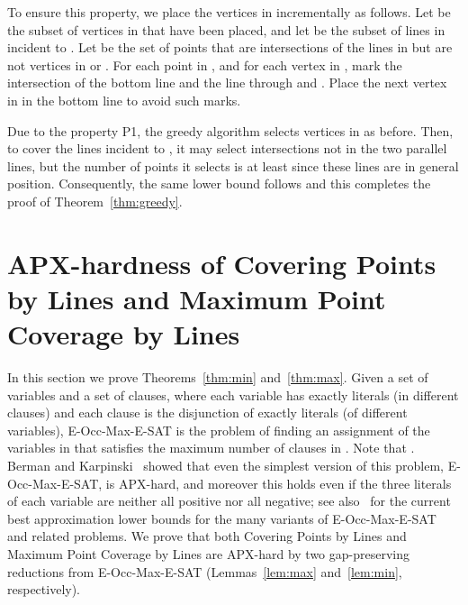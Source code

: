 \documentclass[letterpaper,11pt]{article}
\begin{document}
To ensure this property, we place the vertices in  incrementally
as follows.
Let  be the subset of vertices in  that have been placed,
and let  be the subset of lines in  incident to .
Let  be the set of points that are intersections of the lines in 
but are not vertices in  or .
For each point  in , and for each vertex  in ,
mark the intersection of the bottom line and the line through  and .
Place the next vertex  in  in the bottom line to avoid such marks.

Due to the property P1, the greedy algorithm selects vertices in
 as before. Then, to cover the  lines incident to ,
it may select intersections not in the two parallel lines, but the number
of points it selects is at least 
since these lines are in general position.
Consequently, the same  lower bound follows and this
completes the proof of Theorem~\ref{thm:greedy}. 




\section{APX-hardness of {\sc Covering Points by Lines} and 
{\sc Maximum Point Coverage by Lines}}

In this section we prove
Theorems~\ref{thm:min} and~\ref{thm:max}.
Given a set  of  variables and a set  of  clauses,
where each variable has exactly  literals (in  different clauses)
and each clause is the disjunction of exactly  literals
(of  different variables),
{\sc E-Occ-Max-E-SAT} is the problem of finding an assignment of
the variables in  that satisfies the maximum number of clauses in .
Note that .
Berman and Karpinski~\cite{BK99} showed that
even the simplest version of this problem,
{\sc E-Occ-Max-E-SAT}, is APX-hard,
and moreover this holds even if
the three literals of each variable
are neither all positive nor all negative;
see also~\cite{BK03} for the current best approximation lower bounds for
the many variants of {\sc E-Occ-Max-E-SAT} and related problems.
We prove that both {\sc Covering Points by Lines} and {\sc Maximum Point Coverage
by Lines} are APX-hard by two gap-preserving reductions from {\sc E-Occ-Max-E-SAT}
(Lemmas~\ref{lem:max} and~\ref{lem:min}, respectively). 
\end{document}
